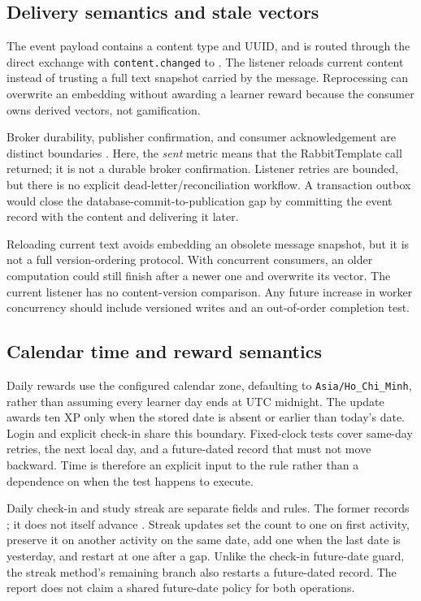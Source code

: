 \documentclass[12pt,a4paper,oneside]{report}
\begin{document}
\subsection{Delivery semantics and stale vectors}
The event payload contains a content type and UUID, and is routed through the
 direct exchange with \texttt{content.changed} to
. The listener reloads current content instead of
trusting a full text snapshot carried by the message. Reprocessing can overwrite an
embedding without awarding a learner reward because the consumer owns derived vectors,
not gamification.

Broker durability, publisher confirmation, and consumer acknowledgement are distinct
boundaries \cite{rabbitconfirms}. Here, the \emph{sent} metric means that the RabbitTemplate
call returned; it is not a durable broker confirmation. Listener retries are bounded,
but there is no explicit dead-letter/reconciliation workflow. A transaction outbox
would close the database-commit-to-publication gap by committing the event record with
the content and delivering it later.

Reloading current text avoids embedding an obsolete message snapshot, but it is not
a full version-ordering protocol. With concurrent consumers, an older computation
could still finish after a newer one and overwrite its vector. The current listener
has no content-version comparison. Any future increase in worker concurrency should
include versioned writes and an out-of-order completion test.

\subsection{Calendar time and reward semantics}
Daily rewards use the configured calendar zone, defaulting to
\texttt{Asia/Ho\_Chi\_Minh}, rather than assuming every learner day ends at UTC midnight.
The update awards ten XP only when the stored date is absent or earlier than today's
date. Login and explicit check-in share this boundary. Fixed-clock tests cover same-day
retries, the next local day, and a future-dated record that must not move backward.
Time is therefore an explicit input to the rule rather than a dependence on when the
test happens to execute.

Daily check-in and study streak are separate fields and rules. The former records
; it does not itself advance . Streak
updates set the count to one on first activity, preserve it on another activity on
the same date, add one when the last date is yesterday, and restart at one after a
gap. Unlike the check-in future-date guard, the streak method's remaining branch
also restarts a future-dated record. The report does not claim a shared future-date
policy for both operations.
\end{document}
